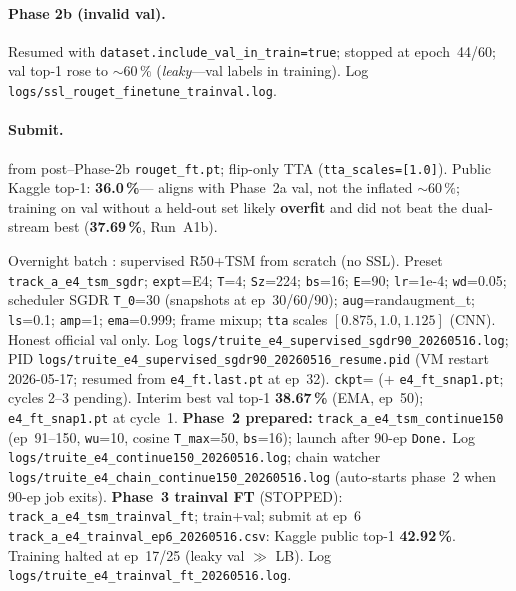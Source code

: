 \begin{table}[ht]
\begin{minipage}{\linewidth}
\begin{description}[leftmargin=1.5em, style=nextline]
  \paragraph{Phase 2b (invalid val).} Resumed with
  \texttt{dataset.include\_val\_in\_train=true}; stopped at epoch~44/60;
  val top-1 rose to \(\sim 60\,\%\) (\emph{leaky}---val labels in training).
  Log \texttt{logs/ssl\_rouget\_finetune\_trainval.log}.
  \paragraph{Submit.}  from
  post--Phase-2b \texttt{rouget\_ft.pt}; flip-only TTA
  (\texttt{tta\_scales=[1.0]}).  Public Kaggle top-1: \textbf{36.0\,\%}---
  aligns with Phase~2a val, not the inflated \(\sim 60\,\%\); training on
  val without a held-out set likely \textbf{overfit} and did not beat the
  dual-stream best (\textbf{37.69\,\%}, Run~A1b).
\item[\textbf{Run E4 / truite batch 20260516} (RUNNING)]
  Overnight batch : supervised R50+TSM from
  scratch (no SSL).  Preset \texttt{track\_a\_e4\_tsm\_sgdr};
  \texttt{expt}=E4; \texttt{T}=4; \texttt{Sz}=224; \texttt{bs}=16;
  \texttt{E}=90; \texttt{lr}=1e-4; \texttt{wd}=0.05;
  scheduler SGDR \texttt{T\_0}=30 (snapshots at ep~30/60/90);
  \texttt{aug}=randaugment\_t; \texttt{ls}=0.1; \texttt{amp}=1;
  \texttt{ema}=0.999; frame mixup; \texttt{tta} scales
  \([0.875,1.0,1.125]\) (CNN).  Honest official val only.
  Log \texttt{logs/truite\_e4\_supervised\_sgdr90\_20260516.log};
  PID \texttt{logs/truite\_e4\_supervised\_sgdr90\_20260516\_resume.pid}
  (VM restart 2026-05-17; resumed from \texttt{e4\_ft.last.pt} at ep~32).
  \texttt{ckpt}= (+ \texttt{e4\_ft\_snap1.pt};
  cycles 2--3 pending).  Interim best val top-1 \textbf{38.67\,\%} (EMA, ep~50);
  \texttt{e4\_ft\_snap1.pt} at cycle~1.  \textbf{Phase~2 prepared:}
  \texttt{track\_a\_e4\_tsm\_continue150} (ep~91--150, \texttt{wu}=10, cosine
  \texttt{T\_max}=50, \texttt{bs}=16); launch after 90-ep \texttt{Done.}
  Log \texttt{logs/truite\_e4\_continue150\_20260516.log};
  chain watcher \texttt{logs/truite\_e4\_chain\_continue150\_20260516.log}
  (auto-starts phase~2 when 90-ep job exits).
  \textbf{Phase~3 trainval FT} (STOPPED): \texttt{track\_a\_e4\_tsm\_trainval\_ft};
  train+val; submit at ep~6 \texttt{track\_a\_e4\_trainval\_ep6\_20260516.csv}:
  Kaggle public top-1 \textbf{42.92\,\%}.  Training halted at ep~17/25 (leaky val
  $\gg$ LB).  Log \texttt{logs/truite\_e4\_trainval\_ft\_20260516.log}.

\end{description}
\end{minipage}
\end{table}
